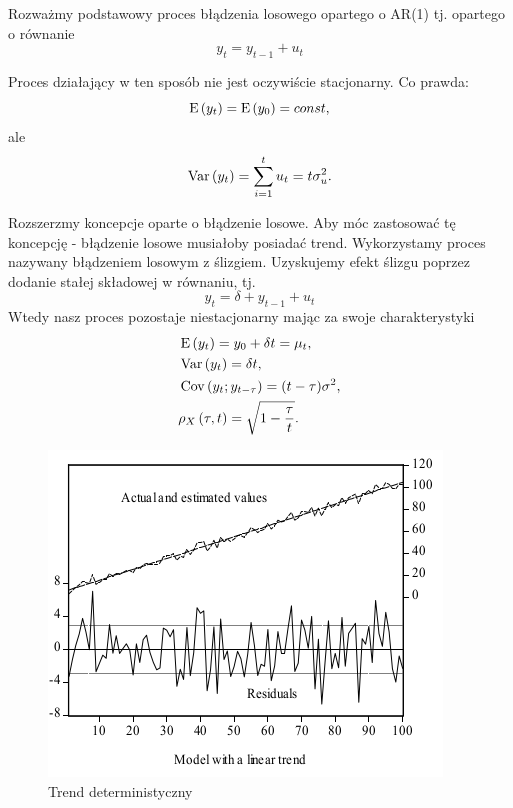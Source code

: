 \documentclass[10pt,a4paper]{book}
\begin{document}
Rozważmy podstawowy proces błądzenia losowego opartego o AR(1) tj. opartego o równanie
$$
y_t = y_{t-1} + u_t
$$

Proces działający w ten sposób nie jest oczywiście stacjonarny. Co prawda:
$$
\operatorname{E} \left({y_t} \right) = \operatorname{E} \left({y_0} \right) = const,
$$
ale
$$
\Variance{y_t} = \sum_{i=1}^{t} u_t = t \sigma^2_u.
$$

Rozszerzmy koncepcje oparte o błądzenie losowe. Aby móc zastosować tę koncepcję - błądzenie losowe musiałoby posiadać trend. Wykorzystamy proces nazywany błądzeniem losowym z ślizgiem. Uzyskujemy efekt ślizgu poprzez dodanie stałej składowej w równaniu, tj. 
$$
y_t = \delta + y_{t-1} + u_t
$$
Wtedy nasz proces pozostaje niestacjonarny mając za swoje charakterystyki
\begin{align*}
& \operatorname{E} \left({y_t} \right)= y_0 + \delta t = \mu_t, \\
& \operatorname{Var} \left( {y_t} \right) = \delta t , \\
& \operatorname{Cov} \left( {y_t};{y_{t-\tau}} \right)= (t-\tau) \sigma^2, \\
& {{\rho_X}\left( {\tau,t} \right)} = \sqrt{1 - \frac{\tau}{t}}.
\end{align*}

\begin{figure}
\centering
\includegraphics[scale=1]{images/deterministic_trend_residuas.png}
\caption{Trend deterministyczny}
\label{figure-deterministic-trend}
\end{figure}
\end{document}
